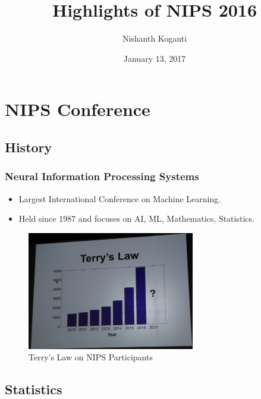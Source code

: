 \documentclass[11pt,
               hyperref={colorlinks,citecolor=pink,linkcolor=red,urlcolor=blue}
               ]{beamer}
\title[NIPS Highlights]{Highlights of NIPS 2016}
\author[Nishanth]{Nishanth Koganti}
\institute[NAIST]{Research Student, Shibata Lab \\ \tiny{Kyushu Institute of Technology}}
\date{January 13, 2017}
\begin{document}
  \begin{frame}[noframenumbering]
    \titlepage
  \end{frame}

  \section{NIPS Conference}

  \subsection{History}

  \begin{frame}
    \frametitle{Neural Information Processing Systems}

    \begin{itemize}
      \item Largest International Conference on Machine Learning.
      \item Held since 1987 and focuses on AI, ML, Mathematics, Statistics.
    \end{itemize}

    \begin{figure}
      \centering
      \includegraphics[width=0.65\textwidth]{terryLaw.jpg}
      \caption*{Terry's Law on NIPS Participants \footnotemark[1]}
    \end{figure}

  \end{frame}

  \subsection{Statistics}
\end{document}
